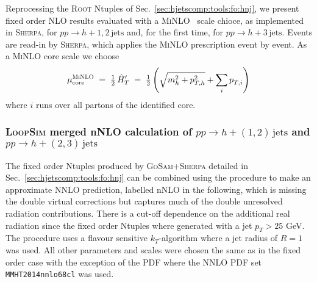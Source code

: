 Reprocessing the \textsc{Root} Ntuples of Sec.\ 
\ref{sec:hjetscomp:tools:fo:hnj}, we present fixed order NLO results evaluated 
with a \textsc{MiNLO}~\cite{Hamilton:2012np} scale chioce, as implemented in
\textsc{Sherpa}, for $pp\to h+1,2\,\text{jets}$ and, for the first time, 
for $pp\to h+3\,\text{jets}$. Events are read-in by \textsc{Sherpa}, which applies
the \textsc{MiNLO} prescription event by event. As a \textsc{MiNLO}
core scale we choose
\begin{equation} \label{eq:hthatprime}
  \mu_\text{core}^\text{\textsc{MiNLO}}
  \;=\;\tfrac{1}{2}\,\hat{H}^\prime_T
  \;=\;\tfrac{1}{2}\left(\sqrt{m_h^{2}+p_{T,h}^{2}}
       +\sum_{i}p_{T,i}^{}\right)\,
\end{equation}
where $i$ runs over all partons of the identified core.

\subsubsection{\textsc{LoopSim} merged nNLO calculation of 
               $pp\to h+(1,2)\,\text{jets}$ and $pp\to h+(2,3)\,\text{jets}$}
\label{sec:hjetscomp:tools:fo:hnjloopsim}

The fixed order Ntuples produced by \textsc{GoSam}{}+\textsc{Sherpa} 
detailed in Sec.\ \ref{sec:hjetscomp:tools:fo:hnj} can be combined 
using the \Loopsim \cite{Rubin:2010xp} procedure to make an approximate 
NNLO prediction, labelled nNLO in the following, which is missing the 
double virtual corrections but captures much of the double unresolved 
radiation contributions. There is a cut-off dependence on the additional 
real radiation since the fixed order Ntuples where generated with a jet 
$p_T>25$ GeV. The \Loopsim procedure uses a flavour sensitive 
$k_T$-algorithm where a jet radius of $R=1$ was used. All other 
parameters and scales were chosen the same as in the fixed order case 
with the exception of the PDF where the NNLO PDF set 
\texttt{MMHT2014nnlo68cl} was used.

